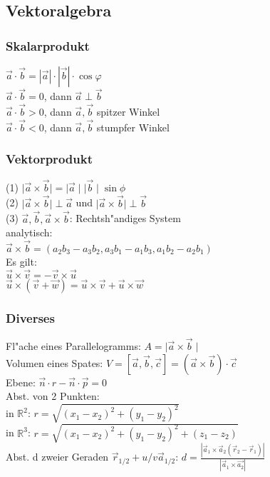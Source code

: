 \documentclass[10pt, a4paper, twocolumn]{scrartcl}
\begin{document}
\subsection{Vektoralgebra}

\subsubsection{Skalarprodukt}
$\vec{a}\cdotp\vec{b}=|\vec{a}|\cdotp|\vec{b}|\cdotp\cos\varphi$\\
$\vec{a}\cdotp\vec{b}=0$, dann $\vec{a}\perp\vec{b}$\\
$\vec{a}\cdotp\vec{b}>0$, dann $\vec{a},\vec{b}$ spitzer Winkel\\
$\vec{a}\cdotp\vec{b}<0$, dann $\vec{a},\vec{b}$ stumpfer Winkel

\subsubsection{Vektorprodukt}
(1) $\mid\vec{a}\times\vec{b}\mid=\mid\vec{a}\mid\mid\vec{b}\mid\sin\phi$\\
(2) $\mid\vec{a}\times\vec{b}\mid\perp\vec{a}$ und $\mid\vec{a}\times\vec{b}\mid\perp\vec{b}$ \\
(3) $\vec{a},\vec{b},\vec{a}\times\vec{b}$: Rechtsh"andiges System \\

analytisch:\\
$\vec{a}\times\vec{b}=(a_2b_3-a_3b_2,a_3b_1-a_1b_3,a_1b_2-a_2b_1)$\\

Es gilt:\\
$\vec{u}\times\vec{v}=-\vec{v}\times\vec{u}$\\
$\vec{u}\times(\vec{v}+\vec{w})=\vec{u}\times\vec{v}+\vec{u}\times\vec{w}$

\subsubsection{Diverses}

Fl"ache eines Parallelogramms: $A=\mid\vec{a}\times\vec{b}\mid$\\
Volumen eines Spates: $V=[\vec{a},\vec{b},\vec{c}]=(\vec{a}\times\vec{b})\cdotp\vec{c}$\\
Ebene: $\vec{n}\cdotp r-\vec{n}\cdotp\vec{p}=0$\\
Abst. von 2 Punkten:\\
in $\mathbb{R}^2$: $r=\sqrt{(x_1-x_2)^2+(y_1-y_2)^2}$\\
in $\mathbb{R}^3$: $r=\sqrt{(x_1-x_2)^2+(y_1-y_2)^2+(z_1-z_2)}$\\
Abst. d zweier Geraden $\vec{r}_{1/2}+u/v\vec{a}_{1/2}$: $d=\frac{|\vec{a}_1\times\vec{a}_2(\vec{r}_2-\vec{r}_1)|}{|\vec{a}_1\times\vec{a_2}|}$ 
\end{document}
